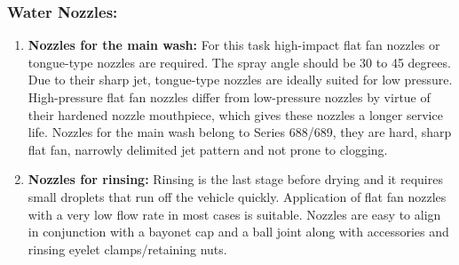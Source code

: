 \documentclass[12pt]{article} %
\begin{document}
\subsubsection{Water Nozzles:} 
\begin{enumerate}
  
                  
\item \textbf{Nozzles for the main wash:}  For this task high-impact flat fan nozzles or tongue-type nozzles are required. The spray angle should be 30 to 45 degrees. Due to their sharp jet, tongue-type nozzles are ideally suited for low pressure. High-pressure flat fan nozzles differ from low-pressure nozzles by virtue of their hardened nozzle mouthpiece, which gives these nozzles a longer service life. Nozzles for the main wash belong to Series 688/689, they are hard, sharp flat fan, narrowly delimited jet pattern and not prone to clogging.
 
 \item \textbf{Nozzles for rinsing:} Rinsing is the last stage before drying and it requires small droplets that run off the vehicle quickly. Application of flat fan nozzles with a very low flow rate in most cases is suitable. Nozzles are easy to align in conjunction with a bayonet cap and a ball joint along with accessories and rinsing eyelet clamps/retaining nuts.


\end{enumerate}
\end{document}

